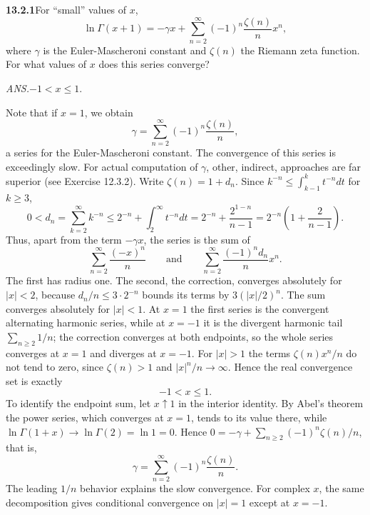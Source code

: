 \par\bigskip
\noindent\textbf{13.2.1}\quad For ``small'' values of $x$,
\[
\ln\Gamma(x+1)=-\gamma x+\sum_{n=2}^{\infty}(-1)^{n}\frac{\zeta(n)}{n}x^{n},
\]
where $\gamma$ is the Euler-Mascheroni constant and $\zeta(n)$ the Riemann
zeta function. For what values of $x$ does this series converge?
\par\nobreak\hfill\emph{ANS.}\enspace $-1 < x\le1$.\par
Note that if $x=1$, we obtain
\[
\gamma=\sum_{n=2}^{\infty}(-1)^{n}\frac{\zeta(n)}{n},
\]
a series for the Euler-Mascheroni constant. The convergence of this series is
exceedingly slow. For actual computation of $\gamma$, other, indirect,
approaches are far superior (see Exercise 12.3.2).
\solution
Write $\zeta(n)=1+d_n$.  Since $k^{-n}\le\int_{k-1}^kt^{-n}dt$ for
$k\ge3$,
\[
0<d_n=\sum_{k=2}^{\infty}k^{-n}
\le 2^{-n}+\int_2^\infty t^{-n}dt
=2^{-n}+\frac{2^{1-n}}{n-1}
=2^{-n}\left(1+\frac2{n-1}\right).
\]
Thus, apart from the term $-\gamma x$, the series is the sum of
\[
\sum_{n=2}^\infty\frac{(-x)^n}n
\qquad\text{and}\qquad
\sum_{n=2}^\infty\frac{(-1)^nd_n}{n}x^n.
\]
The first has radius one.  The second, the correction, converges
absolutely for $|x|<2$, because $d_n/n\le3\cdot2^{-n}$ bounds its
terms by $3(|x|/2)^n$.  The sum converges absolutely for $|x|<1$.
At $x=1$ the first series is the convergent alternating harmonic
series, while at $x=-1$ it is the divergent harmonic tail
$\sum_{n\ge2}1/n$; the correction converges at both endpoints, so the
whole series converges at $x=1$ and diverges at $x=-1$.  For $|x|>1$
the terms $\zeta(n)x^n/n$ do not tend to zero, since $\zeta(n)>1$ and
$|x|^n/n\to\infty$.  Hence the real convergence set is exactly
\[
\boxed{-1<x\le1}.
\]
To identify the endpoint sum, let $x\uparrow1$ in the interior
identity.  By Abel's theorem the power series, which converges at
$x=1$, tends to its value there, while
$\ln\Gamma(1+x)\to\ln\Gamma(2)=\ln1=0$.  Hence
$0=-\gamma+\sum_{n\ge2}(-1)^n\zeta(n)/n$, that is,
\[
\gamma=\sum_{n=2}^{\infty}(-1)^n\frac{\zeta(n)}n.
\]
The leading $1/n$ behavior explains the slow convergence.  For
complex $x$, the same decomposition gives conditional convergence
on $|x|=1$ except at $x=-1$.



